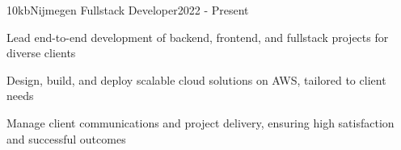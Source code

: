 \resumeSubheading
  {10kb}{Nijmegen}
  {Fullstack Developer}{2022 - Present}
  \vspace{\experienceItemSpacing}
  \resumeItemListStart
\item Lead end-to-end development of backend, frontend, and fullstack projects for diverse clients
\item Design, build, and deploy scalable cloud solutions on AWS, tailored to client needs
\item Manage client communications and project delivery, ensuring high satisfaction and successful outcomes
  \resumeItemListEnd